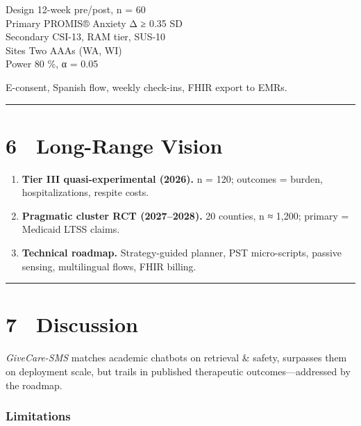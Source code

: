 \documentclass[
]{article}
\providecommand{\tightlist}{%
  \setlength{\itemsep}{0pt}\setlength{\parskip}{0pt}}
\begin{document}
Design \textbar{} 12-week pre/post, n = 60 \textbar{}\\
Primary \textbar{} PROMIS® Anxiety Δ ≥ 0.35 SD \textbar{}\\
Secondary \textbar{} CSI-13, RAM tier, SUS-10 \textbar{}\\
Sites \textbar{} Two AAAs (WA, WI) \textbar{}\\
Power \textbar{} 80 \%, α = 0.05 \textbar{}

E-consent, Spanish flow, weekly check-ins, FHIR export to EMRs.

\begin{center}\rule{0.5\linewidth}{0.5pt}\end{center}

\section{6 Long-Range Vision}\label{long-range-vision}

\begin{enumerate}
\def\labelenumi{\arabic{enumi}.}
\tightlist
\item
  \textbf{Tier III quasi-experimental (2026).} n = 120; outcomes =
  burden, hospitalizations, respite costs.\\
\item
  \textbf{Pragmatic cluster RCT (2027--2028).} 20 counties, n ≈ 1,200;
  primary = Medicaid LTSS claims.\\
\item
  \textbf{Technical roadmap.} Strategy-guided planner, PST
  micro-scripts, passive sensing, multilingual flows, FHIR billing.
\end{enumerate}

\begin{center}\rule{0.5\linewidth}{0.5pt}\end{center}

\section{7 Discussion}\label{discussion}

\emph{GiveCare-SMS} matches academic chatbots on retrieval \& safety,
surpasses them on deployment scale, but trails in published therapeutic
outcomes---addressed by the roadmap.

\subsubsection{Limitations}\label{limitations}
\end{document}
